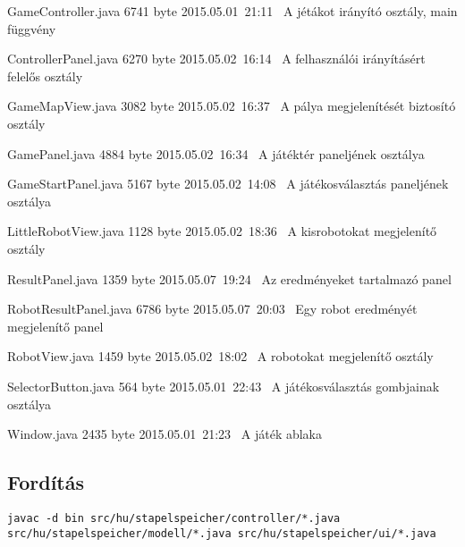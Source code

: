 \begin{fajllista}
\fajl
{GameController.java} %
{6741 byte} %
{2015.05.01~21:11~} %
{A jétákot irányító osztály, main függvény} %

\fajl
{ControllerPanel.java} %
{6270 byte} %
{2015.05.02~16:14~} %
{A felhasználói irányításért felelős osztály} %

\fajl
{GameMapView.java} %
{3082 byte} %
{2015.05.02~16:37~} %
{A pálya megjelenítését biztosító osztály} %

\fajl
{GamePanel.java} %
{4884 byte} %
{2015.05.02~16:34~} %
{A játéktér paneljének osztálya} %

\fajl
{GameStartPanel.java} %
{5167 byte} %
{2015.05.02~14:08~} %
{A játékosválasztás paneljének osztálya} %

\fajl
{LittleRobotView.java} %
{1128 byte} %
{2015.05.02~18:36~} %
{A kisrobotokat megjelenítő osztály} %

\fajl
{ResultPanel.java} %
{1359 byte} %
{2015.05.07~19:24~} %
{Az eredményeket tartalmazó panel} %

\fajl
{RobotResultPanel.java} %
{6786 byte} %
{2015.05.07~20:03~} %
{Egy robot eredményét megjelenítő panel} %

\fajl
{RobotView.java} %
{1459 byte} %
{2015.05.02~18:02~} %
{A robotokat megjelenítő osztály} %

\fajl
{SelectorButton.java} %
{564 byte} %
{2015.05.01~22:43~} %
{A játékosválasztás gombjainak osztálya} %

\fajl
{Window.java} %
{2435 byte} %
{2015.05.01~21:23~} %
{A játék ablaka} %

\end{fajllista}

\subsection{Fordítás}

\lstset{escapeinside=`', xleftmargin=10pt, frame=single, basicstyle=\ttfamily\footnotesize, language=sh}
\begin{lstlisting}
javac -d bin src/hu/stapelspeicher/controller/*.java
src/hu/stapelspeicher/modell/*.java src/hu/stapelspeicher/ui/*.java
\end{lstlisting}

